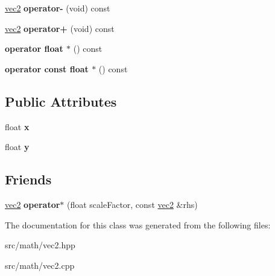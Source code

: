 \begin{DoxyCompactItemize}
\item 
\hypertarget{classmath_1_1vec2_a4be171c89cff623c2b0b18b7be40ae23}{
\hyperlink{classmath_1_1vec2}{vec2} {\bfseries operator-\/} (void) const }
\label{classmath_1_1vec2_a4be171c89cff623c2b0b18b7be40ae23}

\item 
\hypertarget{classmath_1_1vec2_a22cfaea6a72989d8f7f8af0ec844d289}{
\hyperlink{classmath_1_1vec2}{vec2} {\bfseries operator+} (void) const }
\label{classmath_1_1vec2_a22cfaea6a72989d8f7f8af0ec844d289}

\item 
\hypertarget{classmath_1_1vec2_a7be6b451225a1150fef379646cfdc367}{
{\bfseries operator float $\ast$} () const }
\label{classmath_1_1vec2_a7be6b451225a1150fef379646cfdc367}

\item 
\hypertarget{classmath_1_1vec2_ac29d4a4d408660c2347653cd6e3aadd0}{
{\bfseries operator const float $\ast$} () const }
\label{classmath_1_1vec2_ac29d4a4d408660c2347653cd6e3aadd0}

\end{DoxyCompactItemize}
\subsection*{Public Attributes}
\begin{DoxyCompactItemize}
\item 
\hypertarget{classmath_1_1vec2_a80b10d5dce55f531250dc88c9afd2d2b}{
float {\bfseries x}}
\label{classmath_1_1vec2_a80b10d5dce55f531250dc88c9afd2d2b}

\item 
\hypertarget{classmath_1_1vec2_aec0b4a209674ce9a5fba6f76f514f777}{
float {\bfseries y}}
\label{classmath_1_1vec2_aec0b4a209674ce9a5fba6f76f514f777}

\end{DoxyCompactItemize}
\subsection*{Friends}
\begin{DoxyCompactItemize}
\item 
\hypertarget{classmath_1_1vec2_ad09d5f99b2aefd8098e5a6cdf7bcb3f9}{
\hyperlink{classmath_1_1vec2}{vec2} {\bfseries operator$\ast$} (float scaleFactor, const \hyperlink{classmath_1_1vec2}{vec2} \&rhs)}
\label{classmath_1_1vec2_ad09d5f99b2aefd8098e5a6cdf7bcb3f9}

\end{DoxyCompactItemize}


The documentation for this class was generated from the following files:\begin{DoxyCompactItemize}
\item 
src/math/vec2.hpp\item 
src/math/vec2.cpp\end{DoxyCompactItemize}
